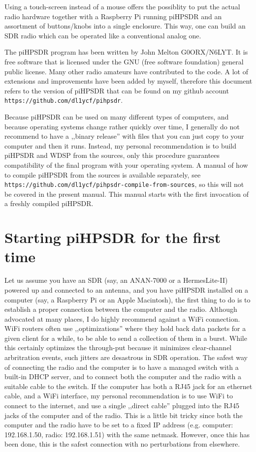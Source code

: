 \documentclass[12pt]{book}
\begin{document}
Using a touch-screen instead of a mouse offers the possiblity to put the actual radio hardware together
with a Raspberry Pi running piHPSDR and an assortment of buttons/knobs into a single enclosure. This way,
one can build an SDR radio which can be operated like a conventional analog one.

The piHPSDR program has been written by John Melton G0ORX/N6LYT. It is free software that is licensed under
the GNU (free software foundation) general public license. Many other radio amateurs have contributed to
the code. A lot of extensions and improvements have been added by myself, therefore this document refers
to the version of piHPSDR that can be found on my github account \texttt{https://github.com/dl1ycf/pihpsdr}.

Because piHPSDR can be used on many different types of computers, and because operating systems change
rather quickly over time, I generally do not recommend to have a ,,binary release'' with files that you
can just copy to your computer and then it runs. Instead, my personal recommendation is to build piHPSDR
and WDSP from the sources, only this procedure guarantees compatibility of the final program with your
operating system. A manual of how to compile piHPSDR from the sources is available separately,
see \texttt{https://github.com/dl1ycf/pihpsdr-compile-from-sources}, so this will not be covered in 
the present manual. This manual starts with the first invocation of a freshly compiled piHPSDR.

\chapter{Starting piHPSDR for the first time}
Let us assume you have an SDR (say, an ANAN-7000 or a HermesLite-II) powered up and connected to an antenna,
and you have piHPSDR installed on a computer (say, a Raspberry Pi or an Apple Macintosh), the first thing to
do is to establish a proper connection between the computer and the radio. Although advocated at many places,
I do highly recommend against a WiFi connection. WiFi routers often use ,,optimizations'' where they hold
back data packets for a given client for a while, to be able to send a collection of them in a burst. While
this certainly optimizes the through-put because it minimizes clear-channel arbritration events, such jitters
are desastrous in SDR operation. The safest way of connecting the radio and the computer is to have a
managed switch with a built-in DHCP server, and to connect both the computer and the radio with a suitable
cable to the switch. If the computer has both a RJ45 jack for an ethernet cable, and a WiFi interface, my
personal recommendation is to use WiFi to connect to the internet, and use a single ,,direct cable'' plugged
into the RJ45 jacks of the computer and of the radio. This is a little bit tricky since both the computer
and the radio have to be set to a fixed IP address (e.g. computer: 192.168.1.50, radio: 192.168.1.51) with
the same netmask. However, once this has been done, this is the safest connection with no perturbations from
elsewhere.
\end{document}

